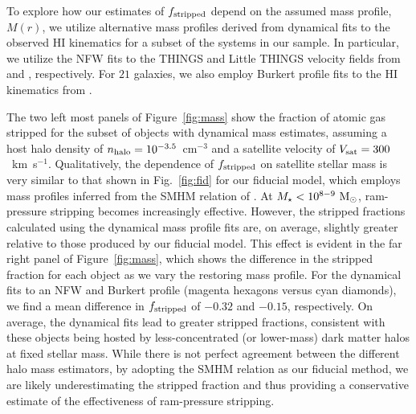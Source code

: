 \documentclass[usenatbib]{mn2e}
\newcommand{\mstar}{{M}_{\star}}
\newcommand{\msun}{{\rm M}_{\odot}}
\begin{document}
To explore how our estimates of $f_{\rm stripped}$ depend on the
assumed mass profile, $M(r)$, we utilize alternative mass profiles
derived from dynamical fits to the observed H{\scriptsize I}
kinematics for a subset of the systems in our sample. In particular,
we utilize the NFW fits to the THINGS and Little THINGS velocity
fields from \citet{deblok08} and \citet{oh15}, respectively. 
%
For $21$ galaxies, we also employ Burkert profile fits to the
H{\scriptsize I} kinematics from \citet{pace16}.
%


The two left most panels of Figure~\ref{fig:mass} show the fraction of
atomic gas stripped for the subset of objects with dynamical mass
estimates, assuming a host halo density of $n_{\rm halo} =
10^{-3.5}$~cm$^{-3}$ and a satellite velocity of $V_{\rm
  sat} = 300$~km~s$^{-1}$. 
%
Qualitatively, the dependence of $f_{\rm stripped}$ on satellite
stellar mass is very similar to that shown in Fig.~\ref{fig:fid} for
our fiducial model, which employs mass profiles inferred from the SMHM
relation of \citet{gk14}.
%
At $\mstar < 10^{8-9}~\msun$, ram-pressure stripping becomes
increasingly effective. 
%
However, the stripped fractions calculated using the dynamical mass
profile fits are, on average, slightly greater relative to those
produced by our fiducial model. 
%
This effect is evident in the far right panel of
Figure~\ref{fig:mass}, which shows the difference in the stripped
fraction for each object as we vary the restoring mass profile.
%
For the dynamical fits to an NFW and Burkert profile (magenta hexagons
versus cyan diamonds), we find a mean difference in $f_{\rm stripped}$
of $-0.32$ and $-0.15$, respectively. 
%
On average, the dynamical fits lead to greater stripped fractions,
consistent with these objects being hosted by less-concentrated (or
lower-mass) dark matter halos at fixed stellar mass. While there is
not perfect agreement between the different halo mass estimators, by
adopting the SMHM relation as our fiducial method, we are likely
underestimating the stripped fraction and thus providing a
conservative estimate of the effectiveness of ram-pressure stripping.





\end{document}
